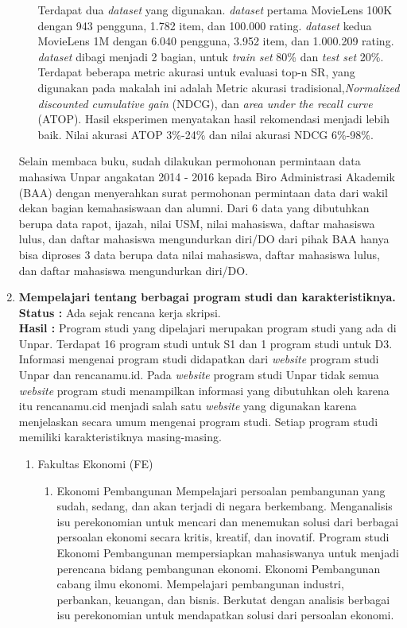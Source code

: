 \documentclass[a4paper,twoside]{article}
\begin{document}
\begin{enumerate}
\begin{itemize}
			Terdapat dua \textit{dataset} yang digunakan. \textit{dataset} pertama MovieLens 100K dengan 943 pengguna, 1.782 item, dan 100.000 rating. \textit{dataset} kedua MovieLens 1M dengan 6.040 pengguna, 3.952 item, dan 1.000.209 rating. \textit{dataset} dibagi menjadi 2 bagian, untuk \textit{train set} 80\% dan \textit{test set} 20\%. 
			Terdapat beberapa metric akurasi untuk evaluasi top-n SR, yang digunakan pada makalah ini adalah Metric akurasi tradisional,\textit{Normalized discounted cumulative gain} (NDCG), dan  \textit{area under the recall curve} (ATOP).
			Hasil eksperimen menyatakan hasil rekomendasi menjadi lebih baik. Nilai akurasi ATOP 3\%-24\% dan nilai akurasi NDCG 6\%-98\%.
		\end{itemize}
		
		Selain membaca buku, sudah dilakukan permohonan permintaan data mahasiwa Unpar angakatan 2014 - 2016 kepada Biro Administrasi Akademik (BAA) dengan menyerahkan surat permohonan permintaan data dari wakil dekan bagian kemahasiswaan dan alumni. Dari 6 data yang dibutuhkan berupa data rapot, ijazah, nilai USM, nilai mahasiswa, daftar mahasiswa lulus, dan daftar mahasiswa mengundurkan diri/DO dari pihak BAA hanya bisa diproses 3 data berupa data nilai mahasiswa, daftar mahasiswa lulus, dan daftar mahasiswa mengundurkan diri/DO. 
		
		\item \textbf{Mempelajari tentang berbagai program studi dan karakteristiknya.}\\
		{\bf Status :} Ada sejak rencana kerja skripsi.\\
		{\bf Hasil :} Program studi yang dipelajari merupakan program studi yang ada di Unpar. Terdapat 16 program studi untuk S1 dan 1 program studi untuk D3. Informasi mengenai program studi didapatkan dari \textit{website} program studi Unpar dan rencanamu.id. Pada \textit{website} program studi Unpar tidak semua \textit{website} program studi menampilkan informasi yang dibutuhkan oleh karena itu rencanamu.cid menjadi salah satu \textit{website} yang digunakan karena menjelaskan secara umum mengenai program studi. Setiap program studi memiliki karakteristiknya masing-masing.
		
		\begin{enumerate}
			\item Fakultas Ekonomi (FE)
			\begin{enumerate}
				\item Ekonomi Pembangunan
					Mempelajari persoalan pembangunan yang sudah, sedang, dan akan terjadi di negara berkembang. Menganalisis isu perekonomian untuk mencari dan menemukan solusi dari berbagai persoalan ekonomi secara kritis, kreatif, dan inovatif. Program studi Ekonomi Pembangunan mempersiapkan mahasiswanya untuk menjadi perencana bidang pembangunan ekonomi. Ekonomi Pembangunan cabang ilmu ekonomi. Mempelajari pembangunan industri, perbankan, keuangan, dan bisnis. Berkutat dengan analisis berbagai isu perekonomian untuk mendapatkan solusi dari persoalan ekonomi.


\end{enumerate}
\end{enumerate}
\end{enumerate}
\end{document}
